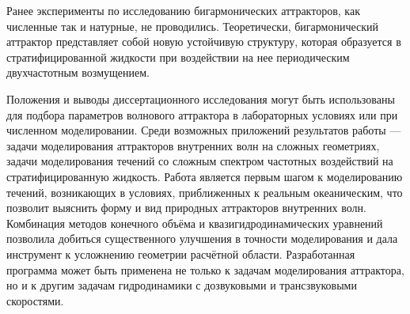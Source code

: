 \documentclass[utf8x]{G7-32} %
\begin{document}
Ранее эксперименты по исследованию бигармонических аттракторов, как численные так и натурные, не проводились. Теоретически, бигармонический аттрактор представляет собой новую устойчивую структуру, которая образуется в стратифицированной жидкости при воздействии на нее периодическим двухчастотным возмущением.

Положения и выводы диссертационного исследования могут быть использованы для подбора параметров  волнового аттрактора в лабораторных условиях или при численном моделировании. Среди возможных приложений результатов работы — задачи моделирования аттракторов внутренних волн на сложных геометриях, задачи моделирования течений со сложным спектром частотных воздействий на стратифицированную жидкость. Работа является первым шагом к моделированию течений, возникающих в условиях, приближенных к реальным океаническим, что позволит выяснить форму и вид природных аттракторов внутренних волн. Комбинация методов конечного объёма и квазигидродинамических уравнений позволила добиться существенного улучшения в точности моделирования и дала инструмент к  усложнению геометрии расчётной области. Разработанная программа может быть применена не только к задачам моделирования аттрактора, но и к другим задачам гидродинамики с дозвуковыми и трансзвуковыми скоростями.
\end{document}

